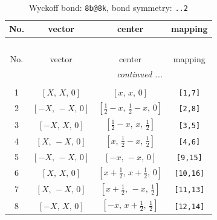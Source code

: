 \documentclass[fleqn,8pt]{jsarticle}
\begin{document}
\renewcommand{\arraystretch}{1.2}
\begin{longtable}{cccc}
\caption{Wyckoff bond: {\tt 8b@8k}, bond symmetry: {\tt ..2}}
 \\
 \hline \hline
No. & vector & center & mapping \\ \hline \endfirsthead

\multicolumn{3}{l}{\tablename\ \thetable{}} \\
 \hline \hline
No. & vector & center & mapping \\ \hline \endhead

 \hline \hline
\multicolumn{3}{r}{\footnotesize\it continued ...} \\ \endfoot

 \hline \hline
\multicolumn{3}{r}{} \\ \endlastfoot

1 & $\left[ X,\, X,\, 0 \right]$ & $\left[ x,\, x,\, 0 \right]$ & {\tt [1,7]} \\ \hline
2 & $\left[ - X,\, - X,\, 0 \right]$ & $\left[ \frac{1}{2} - x,\, \frac{1}{2} - x,\, 0 \right]$ & {\tt [2,8]} \\ \hline
3 & $\left[ - X,\, X,\, 0 \right]$ & $\left[ \frac{1}{2} - x,\, x,\, \frac{1}{2} \right]$ & {\tt [3,5]} \\ \hline
4 & $\left[ X,\, - X,\, 0 \right]$ & $\left[ x,\, \frac{1}{2} - x,\, \frac{1}{2} \right]$ & {\tt [4,6]} \\ \hline
5 & $\left[ - X,\, - X,\, 0 \right]$ & $\left[ - x,\, - x,\, 0 \right]$ & {\tt [9,15]} \\ \hline
6 & $\left[ X,\, X,\, 0 \right]$ & $\left[ x + \frac{1}{2},\, x + \frac{1}{2},\, 0 \right]$ & {\tt [10,16]} \\ \hline
7 & $\left[ X,\, - X,\, 0 \right]$ & $\left[ x + \frac{1}{2},\, - x,\, \frac{1}{2} \right]$ & {\tt [11,13]} \\ \hline
8 & $\left[ - X,\, X,\, 0 \right]$ & $\left[ - x,\, x + \frac{1}{2},\, \frac{1}{2} \right]$ & {\tt [12,14]} \\
\end{longtable}
\renewcommand{\arraystretch}{1.2}
\end{document}
